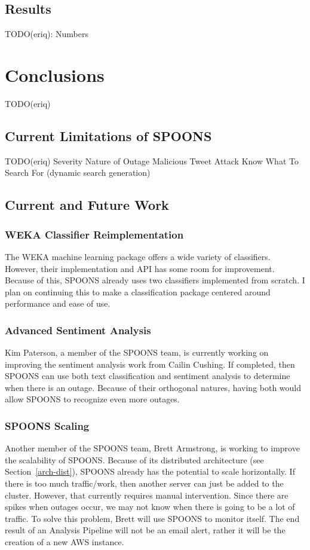 \documentclass[12pt]{ucthesis}
\begin{document}
\chapter{Results}
\label{outage-detection-results}
TODO(eriq): Numbers

\part{Conclusions}
\label{conclusions}
TODO(eriq)

\chapter{Current Limitations of SPOONS}
\label{limitations}
TODO(eriq)
Severity
Nature of Outage
Malicious Tweet Attack
Know What To Search For (dynamic search generation)

\chapter{Current and Future Work}
\label{future-work}

\section{WEKA Classifier Reimplementation}
\label{future-work-weka}
The WEKA machine learning package offers a wide variety of classifiers.
However, their implementation and API has some room for improvement.
Because of this, SPOONS already uses two classifiers implemented from scratch.
I plan on continuing this to make a classification package centered around performance
and ease of use.

\section{Advanced Sentiment Analysis}
\label{future-work-kim}
Kim Paterson, a member of the SPOONS team, is currently working on improving the sentiment
analysis work from Cailin Cushing\cite{cailinThesis}. If completed, then SPOONS can use
both text classification and sentiment analysis to determine when there is an outage.
Because of their orthogonal natures, having both would allow SPOONS to recognize even more outages.

\section{SPOONS Scaling}
\label{future-work-brett}
Another member of the SPOONS team, Brett Armstrong, is working to improve the scalability of SPOONS.
Because of its distributed architecture (see Section~\ref{arch-dist}), SPOONS already has the potential to
scale horizontally. If there is too much traffic/work, then another server can just be added to the cluster.
However, that currently requires manual intervention. Since there are spikes when outages occur, we may not know
when there is going to be a lot of traffic. To solve this problem, Brett will use SPOONS to monitor itself.
The end result of an Analysis Pipeline will not be an email alert, rather it will be the creation of a new
AWS instance.
\end{document}
